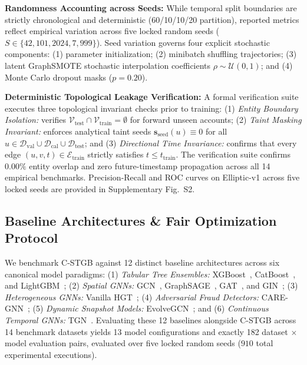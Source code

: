\textbf{Randomness Accounting across Seeds:} While temporal split boundaries are strictly chronological and deterministic (60/10/10/20 partition), reported metrics reflect empirical variation across five locked random seeds ($S \in \{42, 101, 2024, 7, 999\}$). Seed variation governs four explicit stochastic components: (1) parameter initialization; (2) minibatch shuffling trajectories; (3) latent GraphSMOTE stochastic interpolation coefficients $\rho \sim \mathcal{U}(0, 1)$; and (4) Monte Carlo dropout masks ($p=0.20$).

\textbf{Deterministic Topological Leakage Verification:} A formal verification suite executes three topological invariant checks prior to training: (1) \textit{Entity Boundary Isolation:} verifies $\mathcal{V}_{\text{test}} \cap \mathcal{V}_{\text{train}} = \emptyset$ for forward unseen accounts; (2) \textit{Taint Masking Invariant:} enforces analytical taint seeds $\mathbf{s}_{\text{seed}}(u) \equiv 0$ for all $u \in \mathcal{D}_{\text{val}} \cup \mathcal{D}_{\text{cal}} \cup \mathcal{D}_{\text{test}}$; and (3) \textit{Directional Time Invariance:} confirms that every edge $(u, v, t) \in \mathcal{E}_{\text{train}}$ strictly satisfies $t \le t_{\text{train}}$. The verification suite confirms $0.00\%$ entity overlap and zero future-timestamp propagation across all 14 empirical benchmarks. Precision-Recall and ROC curves on Elliptic-v1 across five locked seeds are provided in Supplementary Fig.~S2.

\subsection{Baseline Architectures \& Fair Optimization Protocol}
\label{sec:baselines_protocol}
We benchmark C-STGB against 12 distinct baseline architectures across six canonical model paradigms: (1) \textit{Tabular Tree Ensembles:} XGBoost~\cite{chen2016xgboost}, CatBoost~\cite{prokhorenkova2018catboost}, and LightGBM~\cite{ke2017lightgbm}; (2) \textit{Spatial GNNs:} GCN~\cite{kipf2017semi}, GraphSAGE~\cite{hamilton2017inductive}, GAT~\cite{velickovic2018graph}, and GIN~\cite{xu2019powerful}; (3) \textit{Heterogeneous GNNs:} Vanilla HGT~\cite{hu2020heterogeneous}; (4) \textit{Adversarial Fraud Detectors:} CARE-GNN~\cite{dou2020enhancing}; (5) \textit{Dynamic Snapshot Models:} EvolveGCN~\cite{pareja2020evolvegcn}; and (6) \textit{Continuous Temporal GNNs:} TGN~\cite{rossi2020temporal}. Evaluating these 12 baselines alongside C-STGB across 14 benchmark datasets yields 13 model configurations and exactly 182 dataset $\times$ model evaluation pairs, evaluated over five locked random seeds ($910$ total experimental executions).

